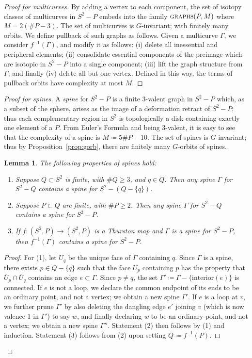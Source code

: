 \documentclass{amsart}
\newtheorem{lem}[thm]{Lemma}
\theoremstyle{definition}
\theoremstyle{remark}
\newcommand{\graphs}{\text{\sc{graphs}}}
\begin{document}
\begin{proof}[Proof for multicurves]
By adding a vertex to each component, the set of isotopy classes of multicurves in $S^2-P$ embeds into the family $\graphs(P,M)$ where $M=2(\#P-3)$. The set of multicurves is $G$-invariant; with finitely many orbits.  We define pullback of such graphs as follows. Given a multicurve $\Gamma$, we consider $f^{-1}(\Gamma)$, and modify it  as follows: (i) delete all inessential and peripheral elements; (ii) consolidate essential components of the preimage which are isotopic in $S^2-P$ into a single component; (iii) lift the graph structure from $\Gamma$; and finally (iv) delete all but one vertex.  Defined in this way, the terms of pullback orbits have complexity at most $M$. 
\end{proof}

\begin{proof}[Proof for spines]
  A \emph{spine} for $S^2-P$ is a finite 3-valent graph in $S^2-P$ which, as a subset of the sphere, arises as the image of a deformation retract of $S^2-P$; thus each complementary region in $S^2$ is topologically a disk containing exactly one element of a $P$. From Euler's Formula and being 3-valent, it is easy to see that the complexity of a spine is $M\coloneqq5\#P-10$.  The set of spines is $G$-invariant; thus by Proposition~\ref{prop:gorb}, there are finitely many $G$-orbits of spines.  

\begin{lem}\label{lemma:eraseone}
    The following properties of spines hold:
\begin{enumerate}
\item Suppose $Q \subset S^2$ is finite, with $\#Q \geq 3$, and $q\in Q$. Then any spine $\Gamma$ for $S^2-Q$ contains a spine for $S^2-(Q - \{q\})$. 
\item Suppose $P \subset Q$ are finite, with $\#P \geq 2$. Then any spine $\Gamma$ for $S^2-Q$ contains a spine for $S^2-P$.  
\item If $f\colon (S^2,P)\to (S^2,P)$ is a Thurston map and $\Gamma$ is a spine for $S^2-P$, then $f^{-1}(\Gamma)$ contains a spine for $S^2-P$. 
\end{enumerate}
\end{lem}

\begin{proof}
  For (1), let $U_q$ be the unique face of $\Gamma$ containing $q$. Since $\Gamma$ is a spine, there exists $p\in Q - \{q\}$ such that the face $U_p$ containing $p$ has the property that $\overline{U}_p \cap \overline{U}_q$ contains an edge $e \subset \Gamma$.  Since $p \neq q$, the set $\Gamma'\coloneqq\Gamma - \{\text{interior}(e)\}$ is connected. If $e$ is not a loop, we declare the common endpoint of its ends to be an ordinary point, and not a vertex; we obtain a new spine $\Gamma'$. If $e$ is a loop at $v$, we further prune $\Gamma'$ by also deleting the dangling edge $e'$ joining $v$ (which is now valence $1$ in $\Gamma'$) to say $w$, and finally declaring $w$ to be an ordinary point, and not a vertex; we obtain a new spine $\Gamma''$. Statement (2) then follows by (1) and induction. Statement (3) follows from (2) upon setting $Q\coloneqq f^{-1}(P)$.
\end{proof}


\end{proof}
\end{document}

